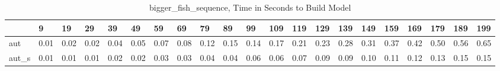 \begin{table}
\centering
\caption{bigger_fish_sequence, Time in Seconds to Build Model}
\label{bigger_fish_sequence_model_time}
\begin{tabular}{lllllllllllllllllllll}
\toprule
{} &     9 &    19 &    29 &    39 &    49 &    59 &    69 &    79 &    89 &    99 &   109 &   119 &   129 &   139 &   149 &   159 &   169 &   179 &   189 &   199 \\
\midrule
aut   &  0.01 &  0.02 &  0.02 &  0.04 &  0.05 &  0.07 &  0.08 &  0.12 &  0.15 &  0.14 &  0.17 &  0.21 &  0.23 &  0.28 &  0.31 &  0.37 &  0.42 &  0.50 &  0.56 &  0.65 \\
aut\_s &  0.01 &  0.01 &  0.01 &  0.02 &  0.02 &  0.03 &  0.03 &  0.04 &  0.04 &  0.06 &  0.06 &  0.07 &  0.09 &  0.09 &  0.10 &  0.11 &  0.12 &  0.13 &  0.15 &  0.15 \\
\bottomrule
\end{tabular}
\end{table}
